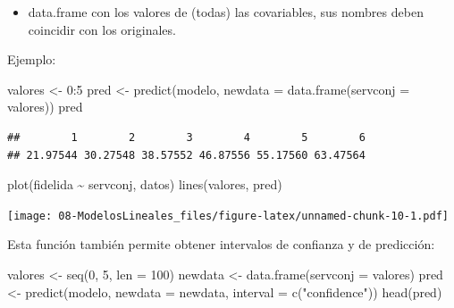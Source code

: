\documentclass[
]{book}
\newenvironment{Shaded}{\begin{snugshade}}{\end{snugshade}}
\newcommand{\AttributeTok}[1]{\textcolor[rgb]{0.77,0.63,0.00}{#1}}
\newcommand{\DecValTok}[1]{\textcolor[rgb]{0.00,0.00,0.81}{#1}}
\newcommand{\FunctionTok}[1]{\textcolor[rgb]{0.00,0.00,0.00}{#1}}
\newcommand{\NormalTok}[1]{#1}
\newcommand{\OtherTok}[1]{\textcolor[rgb]{0.56,0.35,0.01}{#1}}
\newcommand{\SpecialCharTok}[1]{\textcolor[rgb]{0.00,0.00,0.00}{#1}}
\newcommand{\StringTok}[1]{\textcolor[rgb]{0.31,0.60,0.02}{#1}}
\providecommand{\tightlist}{%
  \setlength{\itemsep}{0pt}\setlength{\parskip}{0pt}}
\theoremstyle{break}
\begin{document}
\begin{itemize}
\tightlist
\item
  data.frame con los valores de (todas) las covariables, sus nombres
  deben coincidir con los originales.
\end{itemize}

Ejemplo:

\begin{Shaded}
\begin{Highlighting}[]
\NormalTok{valores }\OtherTok{\textless{}{-}} \DecValTok{0}\SpecialCharTok{:}\DecValTok{5}
\NormalTok{pred }\OtherTok{\textless{}{-}} \FunctionTok{predict}\NormalTok{(modelo, }\AttributeTok{newdata =} \FunctionTok{data.frame}\NormalTok{(}\AttributeTok{servconj =}\NormalTok{ valores))}
\NormalTok{pred}
\end{Highlighting}
\end{Shaded}

\begin{verbatim}
##        1        2        3        4        5        6 
## 21.97544 30.27548 38.57552 46.87556 55.17560 63.47564
\end{verbatim}

\begin{Shaded}
\begin{Highlighting}[]
\FunctionTok{plot}\NormalTok{(fidelida }\SpecialCharTok{\textasciitilde{}}\NormalTok{ servconj, datos)}
\FunctionTok{lines}\NormalTok{(valores, pred)}
\end{Highlighting}
\end{Shaded}

\texttt{[image: 08-ModelosLineales\_files/figure-latex/unnamed-chunk-10-1.pdf]}

Esta función también permite obtener intervalos de confianza y de predicción:

\begin{Shaded}
\begin{Highlighting}[]
\NormalTok{valores }\OtherTok{\textless{}{-}} \FunctionTok{seq}\NormalTok{(}\DecValTok{0}\NormalTok{, }\DecValTok{5}\NormalTok{, }\AttributeTok{len =} \DecValTok{100}\NormalTok{)}
\NormalTok{newdata }\OtherTok{\textless{}{-}} \FunctionTok{data.frame}\NormalTok{(}\AttributeTok{servconj =}\NormalTok{ valores)}
\NormalTok{pred }\OtherTok{\textless{}{-}} \FunctionTok{predict}\NormalTok{(modelo, }\AttributeTok{newdata =}\NormalTok{ newdata, }\AttributeTok{interval =} \FunctionTok{c}\NormalTok{(}\StringTok{"confidence"}\NormalTok{))}
\FunctionTok{head}\NormalTok{(pred)}
\end{Highlighting}
\end{Shaded}
\end{document}
